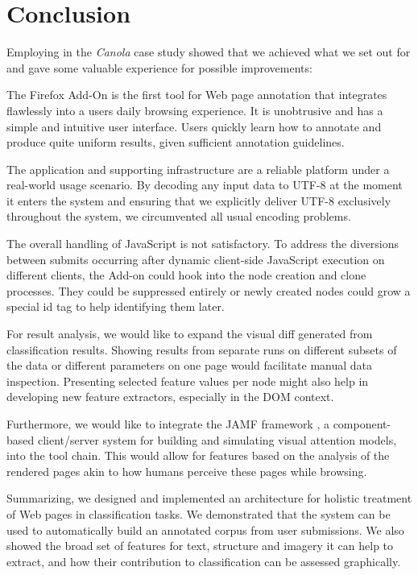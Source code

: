 \section{\label{sec:limitations}Conclusion\label{conc}}

Employing {\KrdWrd} in the \textit{Canola} case study showed that we achieved what we set out for and gave some valuable experience for possible improvements:

The {\KrdWrd} Firefox Add-On is the first tool for Web page annotation that integrates flawlessly into a users daily browsing experience.
It is unobtrusive and has a simple and intuitive user interface.
Users quickly learn how to annotate and produce quite uniform results, given sufficient annotation guidelines.

The {\KrdWrd} application and supporting infrastructure are a reliable platform under a real-world usage scenario.
By decoding any input data to UTF-8 at the moment it enters the system and ensuring that we explicitly deliver UTF-8 exclusively throughout the system, we circumvented all usual encoding problems.

The overall handling of JavaScript is not satisfactory.
To address the diversions between submits occurring after dynamic client-side JavaScript execution on different clients, the Add-on could hook into the node creation and clone processes.
They could be suppressed entirely or newly created nodes could grow a special id tag to help identifying them later.

For result analysis, we would like to expand the visual diff generated from classification results.
Showing results from separate runs on different subsets of the data or different parameters on one page would facilitate manual data inspection.
Presenting selected feature values per node might also help in developing new feature extractors, especially in the DOM context.

Furthermore, we would like to integrate the JAMF framework \cite{Steger08}, a component-based client/server system for building and simulating visual attention models, into the tool chain.
This would allow for features based on the analysis of the rendered pages akin to how humans perceive these pages while browsing.

Summarizing, we designed and implemented an architecture for holistic treatment of Web pages in classification tasks.
We demonstrated that the {\KrdWrd} system can be used to automatically build an annotated corpus from user submissions.
We also showed the broad set of features for text, structure and imagery it can help to extract, and how their contribution to classification can be assessed graphically.

\review{

}


